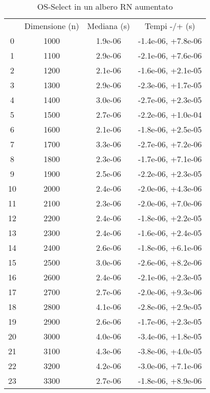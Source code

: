 \begin{table}
\centering
\caption{OS-Select in un albero RN aumentato}
\label{OS-Select in un albero RN aumentato}
\begin{adjustbox}{width=1\textwidth/2}
\begin{tabular}{|c|c|c|c|}
\hline
 & Dimensione (n) & Mediana (s) & Tempi -/+ (s) \\
0 & 1000 & 1.9e-06 & -1.4e-06, +7.8e-06 \\
\cline{1-4}
1 & 1100 & 2.9e-06 & -2.1e-06, +7.6e-06 \\
\cline{1-4}
2 & 1200 & 2.1e-06 & -1.6e-06, +2.1e-05 \\
\cline{1-4}
3 & 1300 & 2.9e-06 & -2.3e-06, +1.7e-05 \\
\cline{1-4}
4 & 1400 & 3.0e-06 & -2.7e-06, +2.3e-05 \\
\cline{1-4}
5 & 1500 & 2.7e-06 & -2.2e-06, +1.0e-04 \\
\cline{1-4}
6 & 1600 & 2.1e-06 & -1.8e-06, +2.5e-05 \\
\cline{1-4}
7 & 1700 & 3.3e-06 & -2.7e-06, +7.2e-06 \\
\cline{1-4}
8 & 1800 & 2.3e-06 & -1.7e-06, +7.1e-06 \\
\cline{1-4}
9 & 1900 & 2.5e-06 & -2.2e-06, +2.3e-05 \\
\cline{1-4}
10 & 2000 & 2.4e-06 & -2.0e-06, +4.3e-06 \\
\cline{1-4}
11 & 2100 & 2.3e-06 & -2.0e-06, +7.0e-06 \\
\cline{1-4}
12 & 2200 & 2.4e-06 & -1.8e-06, +2.2e-05 \\
\cline{1-4}
13 & 2300 & 2.4e-06 & -1.6e-06, +2.4e-05 \\
\cline{1-4}
14 & 2400 & 2.6e-06 & -1.8e-06, +6.1e-06 \\
\cline{1-4}
15 & 2500 & 3.0e-06 & -2.6e-06, +8.2e-06 \\
\cline{1-4}
16 & 2600 & 2.4e-06 & -2.1e-06, +2.3e-05 \\
\cline{1-4}
17 & 2700 & 2.7e-06 & -2.0e-06, +9.3e-06 \\
\cline{1-4}
18 & 2800 & 4.1e-06 & -2.8e-06, +2.9e-05 \\
\cline{1-4}
19 & 2900 & 2.6e-06 & -1.7e-06, +2.3e-05 \\
\cline{1-4}
20 & 3000 & 4.0e-06 & -3.4e-06, +1.8e-05 \\
\cline{1-4}
21 & 3100 & 4.3e-06 & -3.8e-06, +4.0e-05 \\
\cline{1-4}
22 & 3200 & 4.2e-06 & -3.0e-06, +7.1e-06 \\
\cline{1-4}
23 & 3300 & 2.7e-06 & -1.8e-06, +8.9e-06 \\

\end{tabular}
\end{adjustbox}
\end{table}
